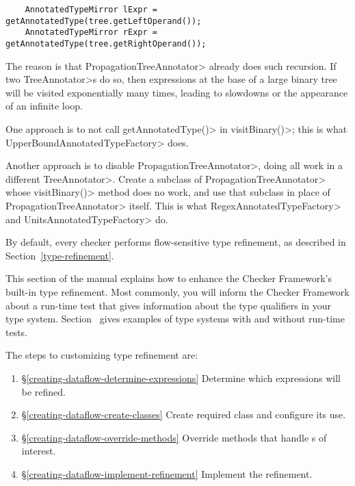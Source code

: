 \begin{Verbatim}
    AnnotatedTypeMirror lExpr = getAnnotatedType(tree.getLeftOperand());
    AnnotatedTypeMirror rExpr = getAnnotatedType(tree.getRightOperand());
\end{Verbatim}

\noindent
The reason is that \<PropagationTreeAnnotator> already does such recursion.  If
two \<TreeAnnotator>s do so, then expressions at the base of a large binary tree
will be visited exponentially many times, leading to slowdowns or the appearance
of an infinite loop.

One approach is to not call \<getAnnotatedType()> in \<visitBinary()>; this is
what \<UpperBoundAnnotatedTypeFactory> does.

Another approach is to disable \<PropagationTreeAnnotator>, doing all work in a
different \<TreeAnnotator>.  Create a subclass of \<PropagationTreeAnnotator>
whose \<visitBinary()> method does no work, and use that subclass in place of
\<PropagationTreeAnnotator> itself.  This is what \<RegexAnnotatedTypeFactory>
and \<UnitsAnnotatedTypeFactory> do.



By default, every checker performs flow-sensitive type refinement, as described
in Section~\ref{type-refinement}.

This section of the manual explains how to enhance the Checker Framework's
built-in type refinement.
Most commonly, you will inform the Checker Framework about a run-time test
that gives information about the type qualifiers in your type system.
Section~ gives examples of
type systems with and without run-time tests.

The steps to customizing type refinement are:
\begin{enumerate}
\item{\S\ref{creating-dataflow-determine-expressions}}
  Determine which expressions will be refined.
\item{\S\ref{creating-dataflow-create-classes}}
  Create required class and configure its use.
\item{\S\ref{creating-dataflow-override-methods}}
  Override methods that handle s of interest.
\item{\S\ref{creating-dataflow-implement-refinement}}
  Implement the refinement.
\end{enumerate}

